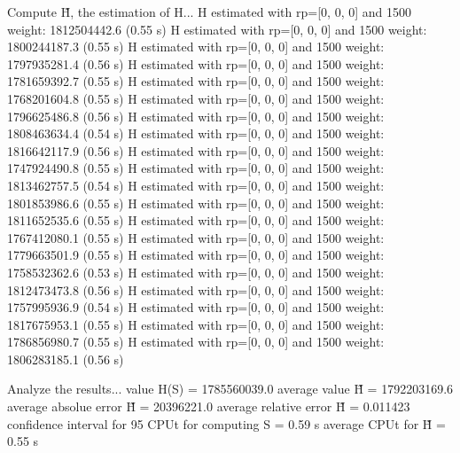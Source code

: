 Compute H̃, the estimation of H...
  H estimated with rp=[0, 0, 0] and 1500 weight:  1812504442.6  (0.55 s)
  H estimated with rp=[0, 0, 0] and 1500 weight:  1800244187.3  (0.55 s)
  H estimated with rp=[0, 0, 0] and 1500 weight:  1797935281.4  (0.56 s)
  H estimated with rp=[0, 0, 0] and 1500 weight:  1781659392.7  (0.55 s)
  H estimated with rp=[0, 0, 0] and 1500 weight:  1768201604.8  (0.55 s)
  H estimated with rp=[0, 0, 0] and 1500 weight:  1796625486.8  (0.56 s)
  H estimated with rp=[0, 0, 0] and 1500 weight:  1808463634.4  (0.54 s)
  H estimated with rp=[0, 0, 0] and 1500 weight:  1816642117.9  (0.56 s)
  H estimated with rp=[0, 0, 0] and 1500 weight:  1747924490.8  (0.55 s)
  H estimated with rp=[0, 0, 0] and 1500 weight:  1813462757.5  (0.54 s)
  H estimated with rp=[0, 0, 0] and 1500 weight:  1801853986.6  (0.55 s)
  H estimated with rp=[0, 0, 0] and 1500 weight:  1811652535.6  (0.55 s)
  H estimated with rp=[0, 0, 0] and 1500 weight:  1767412080.1  (0.55 s)
  H estimated with rp=[0, 0, 0] and 1500 weight:  1779663501.9  (0.55 s)
  H estimated with rp=[0, 0, 0] and 1500 weight:  1758532362.6  (0.53 s)
  H estimated with rp=[0, 0, 0] and 1500 weight:  1812473473.8  (0.56 s)
  H estimated with rp=[0, 0, 0] and 1500 weight:  1757995936.9  (0.54 s)
  H estimated with rp=[0, 0, 0] and 1500 weight:  1817675953.1  (0.55 s)
  H estimated with rp=[0, 0, 0] and 1500 weight:  1786856980.7  (0.55 s)
  H estimated with rp=[0, 0, 0] and 1500 weight:  1806283185.1  (0.56 s)

Analyze the results...
  value H(S)                  = 1785560039.0 
  average value H̃             = 1792203169.6 
  average absolue error H̃     = 20396221.0 
  average relative error H̃    = 0.011423 
  confidence interval for 95%
  CPUt for computing S         = 0.59 s
  average CPUt for H̃           = 0.55 s


